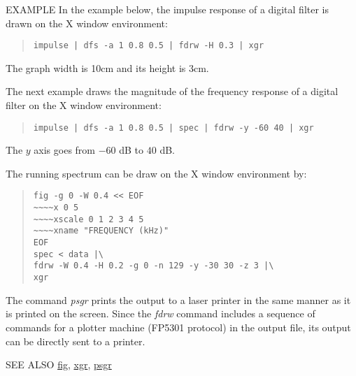 \begin{qsection}{EXAMPLE}
In the example below, the impulse response of a digital filter is
drawn on the X window environment:
\begin{quote}
  \verb!impulse | dfs -a 1 0.8 0.5 | fdrw -H 0.3 | xgr!
\end{quote}
The graph width is 10cm and its height is 3cm.
\par
The next example draws the magnitude of
the frequency response of a digital filter on the X window environment:
\begin{quote}
  \verb!impulse | dfs -a 1 0.8 0.5 | spec | fdrw -y -60 40 | xgr!
\end{quote}
The $y$ axis goes from $-60$ dB to $40$ dB.
\par
The running spectrum can be draw on the X window environment by:
\begin{quote}
 \verb!fig -g 0 -W 0.4 << EOF ! \\
 \verb!~~~~x 0 5 !\\
 \verb!~~~~xscale 0 1 2 3 4 5 !\\
 \verb!~~~~xname "FREQUENCY (kHz)"!\\
 \verb!EOF!\\
 \verb!spec < data |\ !\\
 \verb!fdrw -W 0.4 -H 0.2 -g 0 -n 129 -y -30 30 -z 3 |\ !\\
 \verb!xgr !
\end{quote}
The command {\em psgr} prints the output to a laser printer in the
same manner as it is printed on the screen.
Since the {\em fdrw} command includes a sequence of commands
for a plotter machine (FP5301 protocol) in the output file,
its output can be directly sent to a printer.
\end{qsection}

\begin{qsection}{SEE ALSO}
\hyperlink{fig}{fig},
\hyperlink{xgr}{xgr},
\hyperlink{psgr}{psgr}
\end{qsection}
